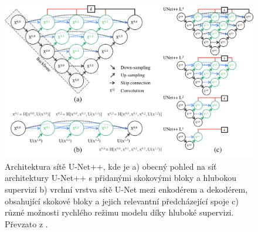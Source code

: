 \begin{figure}[ht]
\centering
\includegraphics[width=1.0\textwidth,keepaspectratio]{Figures/unetpp.png}
\caption[Architektura sítě U-Net++]
{Architektura sítě U-Net++, kde je a) obecný pohled na síť architektury U-Net++ s přidanými skokovými bloky a hlubokou supervizí \uppercase\expandafter{ \relax} b) vrchní vrstva sítě U-Net mezi enkodérem a dekodérem, obsahující skokové bloky a jejich relevantní předcházející spoje c) různé možnosti rychlého režimu modelu díky hluboké supervizi. Převzato z \cite{unetpp}. }
\label{fig:unetpp}
\end{figure}

\endinput